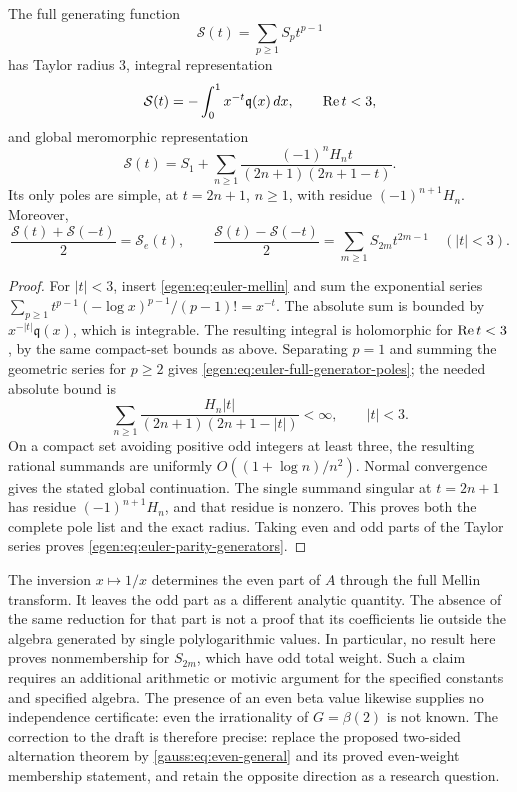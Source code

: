 \begin{proposition}\label{egen:prop:euler-full-generator}
The full generating function
\[
\mathcal S(t)=\sum_{p\ge1}S_pt^{p-1}
\]
has Taylor radius \(3\), integral representation
\begin{equation}
\mathcal S(t)=-\int_0^1x^{-t}\mathfrak q(x)\,dx,\qquad \operatorname{Re} t<3,
\label{egen:eq:euler-full-generator-integral}
\end{equation}
and global meromorphic representation
\begin{equation}
\mathcal S(t)=S_1+\sum_{n\ge1}
 \frac{(-1)^nH_n t}{(2n+1)(2n+1-t)}.
\label{egen:eq:euler-full-generator-poles}
\end{equation}
Its only poles are simple, at \(t=2n+1\), \(n\ge1\), with
residue \((-1)^{n+1}H_n\). Moreover,
\begin{equation}
\frac{\mathcal S(t)+\mathcal S(-t)}2=\mathcal S_e(t),\qquad
\frac{\mathcal S(t)-\mathcal S(-t)}2=\sum_{m\ge1}S_{2m}t^{2m-1}
\quad (|t|<3).
\label{egen:eq:euler-parity-generators}
\end{equation}
\end{proposition}

\begin{proof}
For \(|t|<3\), insert \eqref{egen:eq:euler-mellin} and sum the
exponential series \(\sum_{p\ge1}t^{p-1}(-\log x)^{p-1}/(p-1)!
=x^{-t}\). The absolute sum is bounded by \(x^{-|t|}\mathfrak q(x)\),
which is integrable. The resulting integral is holomorphic for
\(\operatorname{Re} t<3\), by the same compact-set bounds as above.
Separating \(p=1\) and summing the geometric series for \(p\ge2\)
gives \eqref{egen:eq:euler-full-generator-poles}; the needed absolute
bound is
\[
\sum_{n\ge1}\frac{H_n|t|}{(2n+1)(2n+1-|t|)}<\infty,
\qquad |t|<3.
\]
On a compact set avoiding positive odd integers at least three,
the resulting rational summands are uniformly
\(O((1+\log n)/n^2)\). Normal convergence gives the stated global
continuation. The single summand singular at \(t=2n+1\) has residue
\((-1)^{n+1}H_n\), and that residue is nonzero. This proves both
the complete pole list and the exact radius. Taking even and odd
parts of the Taylor series proves \eqref{egen:eq:euler-parity-generators}.
\end{proof}

The inversion \(x\mapsto1/x\) determines the even part of \(A\)
through the full Mellin transform. It leaves the odd part as a
different analytic quantity. The absence of the same reduction for
that part is not a proof that its coefficients lie outside the algebra
generated by single polylogarithmic values. In particular, no result
here proves nonmembership for \(S_{2m}\), which have odd total
weight. Such a claim requires an additional arithmetic or motivic
argument for the specified constants and specified algebra. The
presence of an even beta value likewise supplies no independence
certificate: even the irrationality of \(G=\beta(2)\) is not known.
The correction to the draft is therefore precise: replace the proposed
two-sided alternation theorem by \eqref{gauss:eq:even-general} and its proved
even-weight membership statement, and retain the opposite direction
as a research question.

